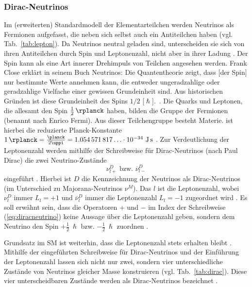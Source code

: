 \documentclass[a4paper,12pt]{article}
\newcommand{\tabref}[1]{Tab.~\ref{#1}}
\begin{document}
\subsubsection{Dirac-Neutrinos} \label{sssec:224}
Im (erweiterten) Standardmodell der Elementarteilchen \cite[vgl.][285--286]{Zyla2020} werden Neutrinos als Fermionen aufgefasst, die neben sich selbst auch ein Antiteilchen haben (vgl. \tabref{tab:lepton}). Da Neutrinos neutral geladen sind, unterscheiden sie sich von ihren Antiteilchen durch Spin und Leptonenzahl, nicht aber in ihrer Ladung \cite[13]{Athar2022}. Der Spin kann als eine Art innerer Drehimpuls von Teilchen angesehen werden. Frank Close erklärt in seinem Buch \glqq Neutrinos\grqq : \glqq Die Quantentheorie zeigt, dass [der Spin] nur bestimmte Werte annehmen kann, die entweder ungeradzahlige oder geradzahlige Vielfache einer gewissen Grundeinheit sind. Aus historischen Gründen ist diese Grundeinheit des Spins $1/2$ [$\mathrm{\hslash}$].\grqq \ \cite[29]{Close2012}. Die Quarks und Leptonen, die allesamt den Spin $\qty[parse-numbers=false]{\frac{1}{2}}{\rplanck}$ haben, bilden die Gruppe der Fermionen (benannt nach Enrico Fermi). Aus dieser Teilchengruppe besteht Materie. \unit{\rplanck} ist hierbei die reduzierte Planck-Konstante $\qty{1}{\rplanck} = \frac{\unit{\planck}}{2\uppi} = \num{1,054571817}\ldots\cdot 10^{-34} \ \unit{\joule\second}$ \cite[1347]{Tipler2024}. Zur Verdeutlichung der Leptonenzahl werden mithilfe der Schreibweise für Dirac-Neutrinos (nach Paul Dirac) die zwei Neutrino-Zustände
\begin{equation}
\nu^D_{l+} \text{ bzw. } \overline{\nu}^D_{l-}
\label{eq:diracneutrino}
\end{equation}   
eingeführt \cite[13]{Athar2022} \cite[23--25]{Athar2020}. 
Hierbei ist $D$ die Kennzeichnung der Neutrinos als Dirac-Neutrinos (im Unterschied zu Majorana-Neutrinos $\nu^M$). Das $l$ ist die Leptonenzahl, wobei $\nu^D_{l}$ immer $L_l=+1$ und $\overline{\nu}^D_{l}$ immer die Leptonenzahl $L_l=-1$ zugeordnet wird \cite[13]{Athar2022}. Es soll erwähnt sein, dass die Operatoren $+$ und $-$ im Index der Schreibweise (\ref{eq:diracneutrino}) keine Aussage über die Leptonenzahl geben, sondern dem Neutrino den Spin $+ \frac{1}{2} \ \hslash$ bzw. $- \frac{1}{2} \ \hslash$ zuordnen \cite[13]{Athar2022}. \par 
Grundsatz im SM ist weiterhin, dass die Leptonenzahl stets erhalten bleibt \cite[285]{Zyla2020}. Mithilfe der eingeführten Schreibweise für Dirac-Neutrinos und der Einführung der Leptonenzahl lassen sich nicht nur zwei, sondern vier unterschiedliche Zustände von Neutrinos gleicher Masse konstruieren (vgl. \tabref{tab:dirac}). Diese vier unterscheidbaren Zustände werden als Dirac-Neutrinos bezeichnet \cite[13]{Athar2022} \cite[23--25]{Athar2020}.
\end{document}
